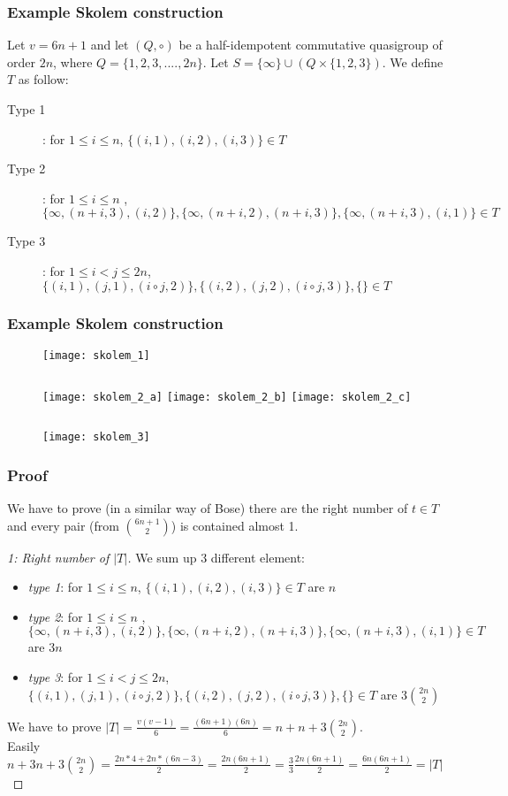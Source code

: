 \begin{frame}
\frametitle{Example Skolem construction}
Let $v = 6n +1$ and let $(Q, \circ)$ be a half-idempotent commutative quasigroup of order $2n$, where $Q = \{ 1,2,3,...., 2n\}$. Let $S = \{\infty\} \cup(Q \times \{1,2,3\})$. We define $T$ as follow:

\begin{description}
	\item[Type 1]: for $1 \le i \le n$, $\{ (i,1), (i,2), (i,3) \} \in T$ 
	\item[Type 2]: for $1 \le i \le n$ , $\{ \infty, (n+i,3),(i,2) \},\{ \infty, (n+i,2),(n+i,3) \},\{\infty,(n+i,3),(i,1) \} \in T$
	\item[Type 3]: for $1 \le i < j \le 2n$,$\{(i,1),(j,1),(i \circ j,2) \}, \{(i,2),(j,2),(i \circ j,3)\},\{\} \in T$
\end{description}
\end{frame}

\begin{frame}
\frametitle{Example Skolem construction}
\begin{figure}
	\texttt{[image: skolem\_1]}
	\begin{columns}
		\texttt{[image: skolem\_2\_a]}
		\texttt{[image: skolem\_2\_b]}
		\texttt{[image: skolem\_2\_c]}
	\end{columns}
	\texttt{[image: skolem\_3]}
\end{figure}
\end{frame}


\begin{frame}
\frametitle{Proof}
We have to prove (in a similar way of Bose) there are the right number of $t \in T$ and every pair (from $\binom{6n + 1}{2}$) is contained almost 1.
\begin{proof}[1: Right number of $|T|$]
We sum up 3 different element:
\small
\begin{itemize}
	\item \textit{type 1}: \textcolor{black!55}{for $1 \le i \le n$, $\{ (i,1), (i,2), (i,3)\} \in T$} are $n$
	\item \textit{type 2}: \textcolor{black!55}{ for $1 \le i \le n$ , $\{\infty, (n+i,3),(i,2)\},\{\infty,(n+i,2),(n+i,3)\},\{\infty,(n+i,3),(i,1) \} \in T$} are $3n$
	\item \textit{type 3}: \textcolor{black!55}{for $1 \le i < j \le 2n$,$\{(i,1),(j,1),(i \circ j,2) \}, \{(i,2),(j,2),(i \circ j,3)\},\{\} \in T$} are $3\binom{2n}{2}$
\end{itemize}
We have to prove $|T|= \frac{v(v-1)}{6} = \frac{(6n+1)(6n)}{6}= n + n + 3\binom{2n}{2}$.\\
Easily $n + 3n + 3\binom{2n}{2}=\frac{2n*4+ 2n*(6n-3)}{2}= \frac{2n(6n +1 )}{2}= \frac{3}{3}\frac{2n(6n +1 )}{2}=\frac{6n(6n +1 )}{2}=|T|$
\end{proof}
\end{frame}

